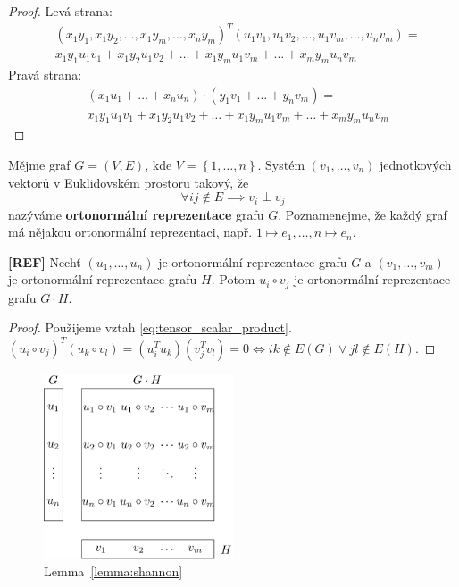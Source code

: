 \begin{proof}
    Levá strana:
    \begin{equation*}
        \begin{split}
        & \left(x_1 y_1, x_1 y_2, \dots, x_1 y_m, \dots, x_n y_m \right)^T \left( u_1 v_1, u_1 v_2, \dots, u_1 v_m, \dots, u_n v_m \right) = \\
        & x_1 y_1 u_1 v_1 + x_1 y_2 u_1 v_2 + \dots + x_1 y_m u_1 v_m + \dots + x_m y_m u_n v_m
        \end{split}
    \end{equation*}
    Pravá strana:
    \begin{equation*}
        \begin{split}
            & \left( x_1 u_1 + \dots + x_n u_n \right) \cdot \left( y_1 v_1 + \dots + y_n v_m \right) = \\
            & x_1 y_1 u_1 v_1 + x_1 y_2 u_1 v_2 + \dots + x_1 y_m u_1 v_m + \dots + x_m y_m u_n v_m
        \end{split}
    \end{equation*}
\end{proof}

Mějme graf $G = (V,E)$, kde $V = \left\{ 1, \dots, n \right\}$. Systém $\left( v_1, \dots, v_n \right)$ jednotkových vektorů v Euklidovském prostoru takový, že
$$
    \forall ij \notin E \implies v_i \perp v_j
$$
nazýváme \textbf{ortonormální reprezentace} grafu $G$. Poznamenejme, že každý graf má nějakou ortonormální reprezentaci, např. $1 \mapsto e_1, \dots, n \mapsto e_n$.

\begin{lm}\textbf{[REF]}
    Nechť $\left( u_1, \dots, u_n \right)$ je ortonormální reprezentace grafu $G$ a $\left( v_1, \dots, v_m \right)$ je ortonormální reprezentace grafu $H$. Potom $u_i \circ v_j$ je ortonormální reprezentace grafu $G \cdot H$.
    \label{lemma:shannon}
\end{lm}

\begin{proof}
    Použijeme vztah \ref{eq:tensor_scalar_product}. $\left( u_i \circ v_j \right)^T \left( u_k \circ v_l \right) = \left( u_i^T u_k \right) \left( v_j^T v_l \right) = 0 \iff ik \notin E(G) \vee jl \notin E(H)$.
\end{proof}

\begin{figure}[h!]
    \centering
    \includegraphics[width=0.5\textwidth]{img/shannon_lemma.png} 
    \caption{Lemma~\ref{lemma:shannon}}
\end{figure}


